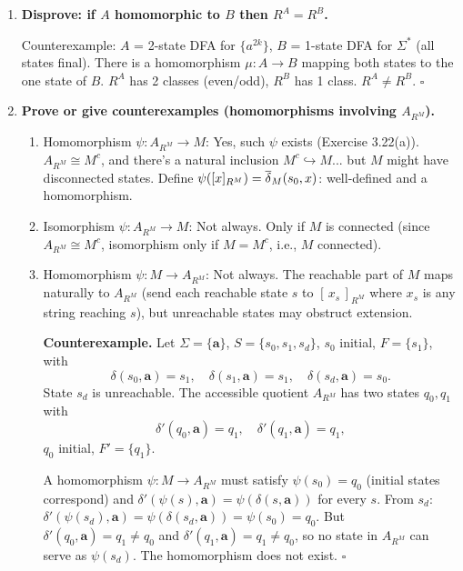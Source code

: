 \begin{enumerate}[{3.}1.]
\item \textbf{Disprove: if $A$ homomorphic to $B$ then $R^A=R^B$.}

Counterexample: $A$ = 2-state DFA for $\{a^{2k}\}$, $B$ = 1-state DFA for $\Sigma^*$ (all states final). There is a homomorphism $\mu: A\to B$ mapping both states to the one state of $B$. $R^A$ has 2 classes (even/odd), $R^B$ has 1 class. $R^A\neq R^B$. $\square$

\item \textbf{Prove or give counterexamples (homomorphisms involving $A_{R^M}$).}

\begin{enumerate}
\item Homomorphism $\psi: A_{R^M}\to M$: Yes, such $\psi$ exists (Exercise 3.22(a)). $A_{R^M}\cong M^c$, and there's a natural inclusion $M^c\hookrightarrow M$... but $M$ might have disconnected states. Define $\psi([x]_{R^M})=\overline{\delta}_M(s_0,x)$: well-defined and a homomorphism.

\item Isomorphism $\psi: A_{R^M}\to M$: Not always. Only if $M$ is connected (since $A_{R^M}\cong M^c$, isomorphism only if $M=M^c$, i.e., $M$ connected).

\item Homomorphism $\psi: M\to A_{R^M}$: Not always. The reachable part of $M$ maps naturally to $A_{R^M}$ (send each reachable state $s$ to $[\,x_s\,]_{R^M}$ where $x_s$ is any string reaching $s$), but unreachable states may obstruct extension.

\textbf{Counterexample.} Let $\Sigma=\{\mathbf{a}\}$, $S=\{s_0,s_1,s_{d}\}$, $s_0$ initial, $F=\{s_1\}$, with
\[
  \delta(s_0,\mathbf{a})=s_1,\quad \delta(s_1,\mathbf{a})=s_1,\quad \delta(s_d,\mathbf{a})=s_0.
\]
State $s_d$ is unreachable. The accessible quotient $A_{R^M}$ has two states $q_0,q_1$ with
\[
  \delta'(q_0,\mathbf{a})=q_1,\quad \delta'(q_1,\mathbf{a})=q_1,
\]
$q_0$ initial, $F'=\{q_1\}$.

A homomorphism $\psi:M\to A_{R^M}$ must satisfy $\psi(s_0)=q_0$ (initial states correspond) and $\delta'(\psi(s),\mathbf{a})=\psi(\delta(s,\mathbf{a}))$ for every $s$.
From $s_d$: $\delta'(\psi(s_d),\mathbf{a})=\psi(\delta(s_d,\mathbf{a}))=\psi(s_0)=q_0$.
But $\delta'(q_0,\mathbf{a})=q_1\neq q_0$ and $\delta'(q_1,\mathbf{a})=q_1\neq q_0$, so no state in $A_{R^M}$ can serve as $\psi(s_d)$. The homomorphism does not exist. $\square$
\end{enumerate}


\end{enumerate}
